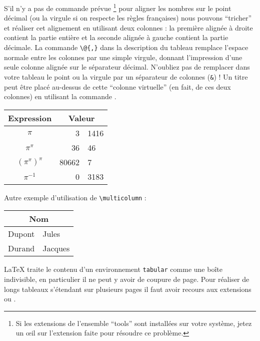%
%

 S'il n'y a pas de commande prévue%
\footnote{Si les extensions de l'ensemble \enquote{tools} sont installées
          sur votre système, jetez un \oe il sur l'extension
           faite pour résoudre ce problème.}
pour aligner les nombres sur le point décimal (ou la virgule si on
respecte les règles françaises) nous pouvons \enquote{tricher} et
réaliser cet alignement en utilisant deux colonnes : la première
alignée à droite contient la partie entière et la seconde alignée à
gauche contient la partie décimale. La commande \verb|\@{,}| dans la
description du tableau remplace l'espace normale entre les colonnes par
une simple virgule, donnant l'impression d'une seule colonne alignée
sur le séparateur décimal. N'oubliez pas de remplacer dans votre
tableau le point ou la virgule
par un séparateur de colonnes (\verb|&|) ! Un titre peut être
placé au-dessus de cette \enquote{colonne virtuelle} (en fait, de ces deux
colonnes) en utilisant la commande .

\begin{example}
\begin{tabular}{c r @{,} l}
Expression       &
\multicolumn{2}{c}{Valeur} \\
\hline
$\pi$               & 3&1416  \\
$\pi^{\pi}$         & 36&46   \\
$(\pi^{\pi})^{\pi}$ & 80662&7 \\
$\pi^{-1}$          & 0&3183 \\
\end{tabular}
\end{example}
Autre exemple d'utilisation de \verb+\multicolumn+ :
\begin{example}
\begin{tabular}{|l|l|}
\hline
\multicolumn{2}{|c|}{%
  \textbf{Nom}} \\
\hline
Dupont & Jules \\
Durand & Jacques \\
\hline
\end{tabular}
\end{example}

\LaTeX{} traite le contenu d'un environnement \texttt{tabular} comme
une boîte indivisible, en particulier il ne peut y avoir de coupure de
page. Pour réaliser de longs tableaux s'étendant sur plusieurs pages
il faut avoir recours aux extensions  ou
.

